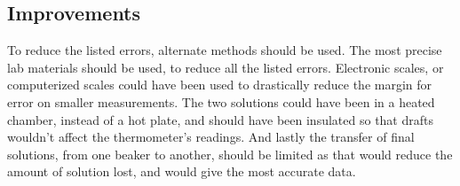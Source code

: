 \documentclass{article}
\begin{document}
\subsection*{Improvements} %
To reduce the listed errors, alternate methods should be used. The most precise lab materials should be used, to reduce all the listed errors. Electronic scales, or computerized scales could have been used to drastically reduce the margin for error on smaller measurements. The two solutions could have been in a heated chamber, instead of a hot plate, and should have been insulated so that drafts wouldn't affect the thermometer's readings. And lastly the transfer of final solutions, from one beaker to another, should be limited as that would reduce the amount of solution lost, and would give the most accurate data. 
\end{document}
